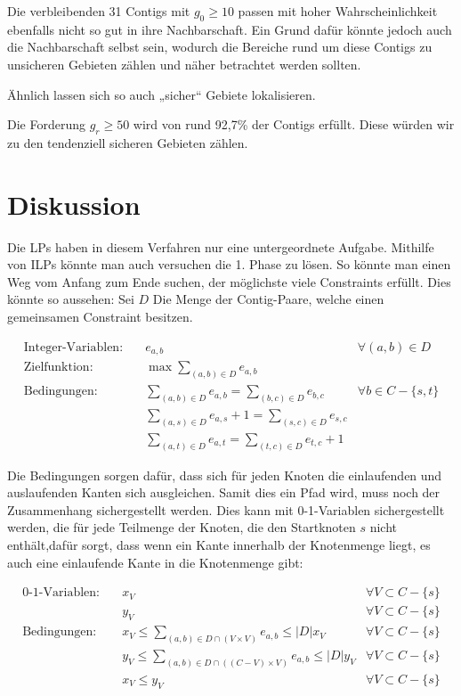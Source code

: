 Die verbleibenden 31 Contigs mit $g_0 \geq 10$ passen mit hoher Wahrscheinlichkeit ebenfalls nicht so gut in ihre Nachbarschaft. Ein Grund dafür könnte jedoch auch die Nachbarschaft selbst sein, wodurch die Bereiche rund um diese Contigs zu unsicheren Gebieten zählen und näher betrachtet werden sollten.


Ähnlich lassen sich so auch „sicher“ Gebiete lokalisieren.

Die Forderung $g_r \geq 50$ wird von rund 92,7\% der Contigs erfüllt. Diese würden wir zu den tendenziell sicheren Gebieten zählen.
\section{Diskussion}
Die LPs haben in diesem Verfahren nur eine untergeordnete Aufgabe. Mithilfe von ILPs könnte man auch versuchen die 1. Phase zu lösen.
So könnte man einen Weg vom Anfang zum Ende suchen, der möglichste viele Constraints erfüllt. 
Dies könnte so aussehen: Sei $D$ Die Menge der Contig-Paare, welche einen gemeinsamen Constraint besitzen.

\begin{align*}
\text{Integer-Variablen:}\quad& e_{a,b} &\forall (a,b) \in D\\
\text{Zielfunktion:}\quad& \max \sum_{(a,b) \in D} e_{a,b}\\
\text{Bedingungen:}\quad& \sum_{(a,b) \in D} e_{a,b} = \sum_{(b,c) \in D} e_{b,c} &\forall b \in C-\{s,t\}\\
& \sum_{(a,s) \in D} e_{a,s}+1 = \sum_{(s,c) \in D} e_{s,c}\\
& \sum_{(a,t) \in D} e_{a,t} = \sum_{(t,c) \in D} e_{t,c} +1
\end{align*}

Die Bedingungen sorgen dafür, dass sich für jeden Knoten die einlaufenden und auslaufenden Kanten sich ausgleichen. Samit dies ein Pfad wird, muss noch der Zusammenhang sichergestellt werden. Dies kann mit 0-1-Variablen sichergestellt werden, die für jede Teilmenge der Knoten, die den Startknoten $s$ nicht enthält,dafür sorgt, dass wenn ein Kante innerhalb der Knotenmenge liegt, es auch eine einlaufende Kante in die Knotenmenge gibt:

\begin{align*}
\text{0-1-Variablen:}\quad& x_V &\forall V \subset C-\{s\}\\
\quad& y_V &\forall V \subset C-\{s\}\\
\text{Bedingungen:}\quad&  x_V \leq \sum_{(a,b) \in D \cap (V \times V)}  e_{a,b} \leq |D| x_V  &\forall V \subset C-\{s\}\\
\quad&  y_V \leq \sum_{(a,b) \in D \cap ((C-V) \times V)}  e_{a,b} \leq |D| y_V  &\forall V \subset C-\{s\}\\
\quad&  x_V \leq y_V  &\forall V \subset C-\{s\}
\end{align*}

